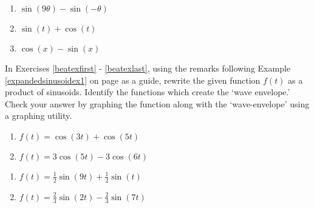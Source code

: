 \begin{multicols}{3}

\begin{enumerate}

\setcounter{enumi}{\value{HW}}

\item $\sin(9\theta) - \sin(-\theta)$
\item $\sin(t) + \cos(t)$
\item $\cos(x) - \sin(x)$ \label{sumprodlast}

\setcounter{HW}{\value{enumi}}

\end{enumerate}

\end{multicols}


In Exercises \ref{beatexfirst} - \ref{beatexlast}, using the remarks following Example \ref{expandedsinusoidex1} on page \pageref{beats} as a guide,  rewrite the given function $f(t)$ as a product of sinusoids. Identify the functions which create the `wave envelope.' Check your answer by graphing  the function along with the `wave-envelope' using a graphing utility.

\begin{multicols}{2}

\begin{enumerate}

\setcounter{enumi}{\value{HW}}

\item $f(t) = \cos(3t) + \cos(5t)$ \label{beatexfirst}
\item $f(t) = 3\cos(5t) - 3\cos(6t)$
\setcounter{HW}{\value{enumi}}

\end{enumerate}

\end{multicols}

\begin{multicols}{2}

\begin{enumerate}

\setcounter{enumi}{\value{HW}}

\item $f(t) = \frac{1}{2} \sin(9t) + \frac{1}{2} \sin(t)$
\item $f(t) = \frac{2}{3}\sin(2t) - \frac{2}{3}\sin(7t)$\label{beatexlast}

\setcounter{HW}{\value{enumi}}

\end{enumerate}

\end{multicols}

